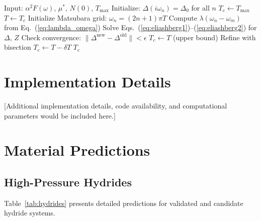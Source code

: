 \documentclass[11pt,a4paper]{article}
\theoremstyle{definition}
\begin{document}
\begin{algorithm}
\caption{Eliashberg Self-Consistent Solution}
\begin{algorithmic}[1]
\State Input: $\alpha^2F(\omega)$, $\mu^*$, $N(0)$, $T_{\text{max}}$
\State Initialize: $\Delta(i\omega_n) = \Delta_0$ for all $n$
\State $T_c \leftarrow T_{\text{max}}$
    \State $T \leftarrow T_c$
    \State Initialize Matsubara grid: $\omega_n = (2n+1)\pi T$
    \State Compute $\lambda(\omega_n - \omega_m)$ from Eq.~(\ref{eq:lambda_omega})
    \Repeat
        \State Solve Eqs.~(\ref{eq:eliashberg1})--(\ref{eq:eliashberg2}) for $\Delta$, $Z$
        \State Check convergence: $\|\Delta^{\text{new}} - \Delta^{\text{old}}\| < \epsilon$
        \State $T_c \leftarrow T$ (upper bound)
        \State Refine with bisection
    \Else
        \State $T_c \leftarrow T - \delta T$
    \EndIf
\EndWhile
\State \Return $T_c$
\end{algorithmic}
\end{algorithm}

\section{Implementation Details}\label{sec:implementation}

[Additional implementation details, code availability, and computational parameters would be included here.]

\section{Material Predictions}\label{sec:predictions}

\subsection{High-Pressure Hydrides}

Table~\ref{tab:hydrides} presents detailed predictions for validated and candidate hydride systems.
\end{document}
